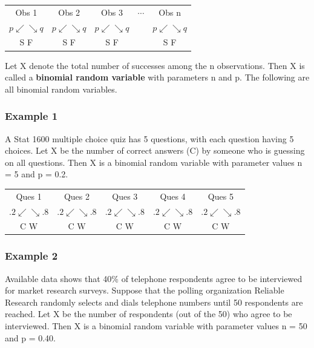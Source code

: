 \documentclass[11pt, chapterprefix=true]{scrbook}\usepackage[]{graphicx}\usepackage[]{color}
\begin{document}
\begin{center}
\begin{tabular}{@{} ccccc @{}} \hline
Obs 1 & Obs 2 & Obs 3 & $\cdots$ & Obs n \\
$p \swarrow  \searrow q$ & $p \swarrow  \searrow q$ & $p \swarrow  \searrow q$ & & $p \swarrow  \searrow q$ \\
S \hspace{3mm}   F & S  \hspace{3mm}  F &  S  \hspace{3mm}  F &  & S \hspace{3mm}   F \\ \hline
\end{tabular}
\end{center}

Let X denote the total number of successes among the n observations.  Then
X is called a \textbf{binomial random variable}  with parameters n and p. The following are all binomial random variables.

\subsubsection{Example 1} A Stat 1600 multiple choice quiz has 5 questions, with each question having 5 choices.  Let X be the number of correct answers (C) by someone who is guessing on all questions.  Then X is a binomial random variable with parameter values n = 5 and p = 0.2.

\begin{center}
\begin{tabular}{@{} ccccc @{}} \hline
Ques 1 & Ques 2 & Ques 3 & Ques 4 & Ques 5 \\
$.2 \swarrow  \searrow .8$ & $.2 \swarrow  \searrow .8$ & $.2 \swarrow  \searrow .8$ & $.2 \swarrow  \searrow .8$ & $.2 \swarrow  \searrow .8$ \\
C \hspace{3mm} W & C  \hspace{3mm}  W &  C  \hspace{3mm}  W &   C \hspace{3mm} W & C \hspace{3mm}   W \\ \hline
\end{tabular}
\end{center}

\subsubsection{Example 2} Available data shows that 40\% of telephone respondents agree to be interviewed for market research surveys.  Suppose that the polling organization Reliable Research randomly selects and dials telephone numbers until 50 respondents are reached.  Let X be the number of respondents (out of the 50) who agree to be interviewed.  Then X is a binomial random variable with parameter values n = 50 and p = 0.40.
\end{document}
